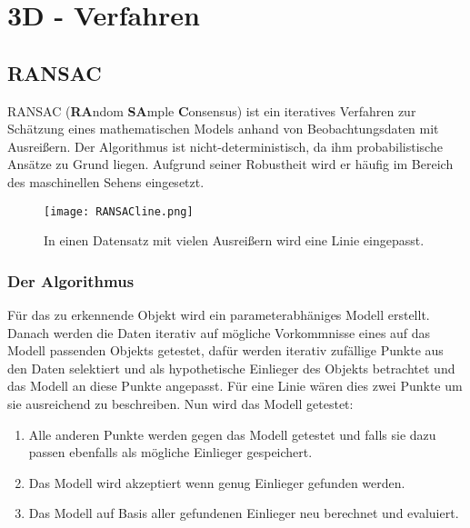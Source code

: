 
\chapter{3D - Verfahren}
\label{chap:3d}
\section{RANSAC}
RANSAC (\textbf{RA}ndom \textbf{SA}mple \textbf{C}onsensus) \cite{Fischler1981} ist ein iteratives Verfahren zur Schätzung eines mathematischen Models anhand von Beobachtungsdaten mit Ausreißern. Der Algorithmus ist nicht-deterministisch, da ihm probabilistische Ansätze zu Grund liegen. Aufgrund seiner Robustheit wird er häufig im Bereich des maschinellen Sehens eingesetzt. 


\begin{figure}[H]
  \begin{center}
    \texttt{[image: RANSACline.png]}
    \caption{In einen Datensatz mit vielen Ausreißern wird eine Linie eingepasst.}
    \label{fig:ransac1}
  \end{center}
\end{figure}

\subsection{Der Algorithmus}
 Für das zu erkennende Objekt wird ein parameterabhäniges Modell erstellt. Danach werden die Daten iterativ auf mögliche Vorkommnisse eines auf das Modell passenden Objekts getestet, dafür werden iterativ zufällige Punkte aus den Daten selektiert und als hypothetische Einlieger des Objekts betrachtet und das Modell an diese Punkte angepasst. Für eine Linie wären dies zwei Punkte um sie ausreichend zu beschreiben. Nun wird das Modell getestet:

\begin{enumerate}
\item Alle anderen Punkte werden gegen das Modell getestet und falls sie dazu passen ebenfalls als mögliche Einlieger gespeichert.
\item Das Modell wird akzeptiert wenn genug Einlieger gefunden werden.
\item Das Modell auf Basis aller gefundenen Einlieger neu berechnet und evaluiert.
\end{enumerate}

